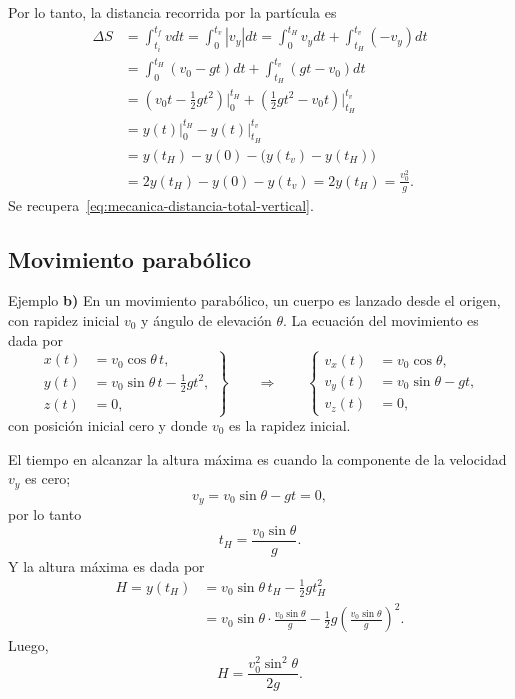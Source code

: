 \documentclass[../apunte_mecanica_clasica.tex]{subfiles}%
\begin{document}
Por lo tanto, la distancia recorrida por la partícula es
\begin{align*}
    \Delta S
    &=\int_{t_i}^{t_f}vdt
      =\int_{0}^{t_v}|v_y|dt
      =\int_{0}^{t_H}v_y dt+\int_{t_H}^{t_v}(-v_y)dt \\
    &=\int_{0}^{t_H}(v_0-gt)dt+\int_{t_H}^{t_v}(gt-v_0)dt \\
    &=\left(v_0t-\frac{1}{2}gt^2\right)\Big|_{0}^{t_H}
      +\left(\frac{1}{2}gt^2-v_0t\right)\Big|_{t_H}^{t_v} \\
    &=y(t)\Big|_{0}^{t_H}-y(t)\Big|_{t_H}^{t_v} \\
    &=y(t_H)-y(0)-\bigl(y(t_v)-y(t_H)\bigr) \\
    &=2y(t_H)-y(0)-y(t_v)
      =2y(t_H)=\frac{v_0^2}{g}.
\end{align*}
Se recupera~\eqref{eq:mecanica-distancia-total-vertical}.

\subsection{Movimiento parabólico}

\begin{apuntebloque}{Ejemplo}
\textbf{b)} En un movimiento parabólico, un cuerpo es lanzado desde el origen, con rapidez inicial $v_0$ y ángulo de elevación $\theta$. La ecuación del movimiento es dada por
\begin{equation}
\left.
\begin{aligned}
    x(t)&=v_0\cos\theta\,t,\\
    y(t)&=v_0\sin\theta\,t-\frac{1}{2}gt^2,\\
    z(t)&=0,
\end{aligned}
\right\}
\qquad\Longrightarrow\qquad
\left\{
\begin{aligned}
    v_x(t)&=v_0\cos\theta,\\
    v_y(t)&=v_0\sin\theta-gt,\\
    v_z(t)&=0,
\end{aligned}
\right.
\label{eq:mecanica-movimiento-parabolico}
\end{equation}
con posición inicial cero y donde $v_0$ es la rapidez inicial.
\end{apuntebloque}

El tiempo en alcanzar la altura máxima es cuando la componente de la velocidad $v_y$ es cero;
\begin{equation*}
    v_y=v_0\sin\theta-gt=0,
\end{equation*}
por lo tanto
\begin{equation}
    t_H=\frac{v_0\sin\theta}{g}.
    \label{eq:mecanica-tiempo-altura-maxima-parabolico}
\end{equation}
Y la altura máxima es dada por
\begin{align*}
    H=y(t_H)
    &=v_0\sin\theta\,t_H-\frac{1}{2}gt_H^2 \\
    &=v_0\sin\theta\cdot\frac{v_0\sin\theta}{g}
      -\frac{1}{2}g\left(\frac{v_0\sin\theta}{g}\right)^2.
\end{align*}
Luego,
\begin{equation}
    H=\frac{v_0^2\sin^2\theta}{2g}.
    \label{eq:mecanica-altura-maxima-parabolico}
\end{equation}
\end{document}
